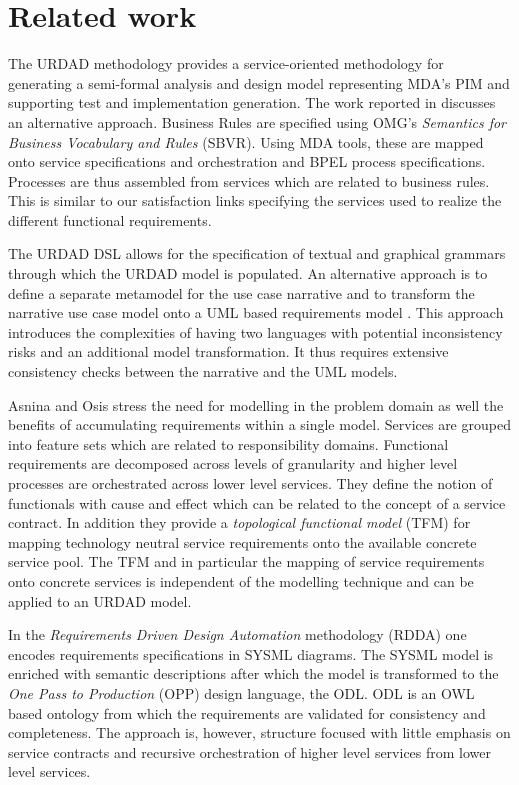 \section{Related work}
\label{sec:relatedWork}
The URDAD methodology provides a service-oriented methodology for generating a semi-formal analysis and design model representing MDA's PIM and supporting test and implementation generation. The work reported in \cite{iacob_model-driven_2008} discusses an alternative approach. Business Rules are specified using OMG's {\em Semantics for Business Vocabulary and Rules} (SBVR). Using MDA tools, these are mapped onto service specifications and orchestration and BPEL process specifications. Processes are thus assembled from services which are related to business rules. This is similar to our satisfaction links specifying the services used to realize the different functional requirements.

The URDAD DSL allows for the specification of textual and graphical grammars through which the URDAD model is populated. An alternative approach is to define a separate metamodel for the use case narrative and to transform the narrative use case model onto a UML based requirements model \cite{hoffmann_towards_2009,osis_transforming_2010}. This approach introduces the complexities of having two languages with potential inconsistency risks and an additional model transformation. It thus requires extensive consistency checks between the narrative and the UML models.

Asnina and Osis \cite{asnina_computation_2010} stress the need for modelling in the problem domain as well the benefits of accumulating requirements within a single model. Services are grouped into feature sets which are related to responsibility domains. Functional requirements are decomposed across levels of granularity and higher level processes are orchestrated across lower level services. They define the notion of functionals with cause and effect which can be related to the concept of a service contract. In addition they provide a {\em topological functional model} (TFM) for mapping technology neutral service requirements onto the available concrete service pool. The TFM and in particular the mapping of service requirements onto concrete services is independent of the modelling technique and can be applied to an URDAD model. 

In the {\em Requirements Driven Design Automation} methodology (RDDA) \cite{cardei_model_2008} one encodes requirements specifications in SYSML diagrams. The SYSML model is enriched with semantic descriptions after which the model is transformed to the {\em One Pass to Production} (OPP) design language, the ODL. ODL is an OWL based ontology from which the requirements are validated for consistency and completeness. The approach is, however, structure focused with little emphasis on service contracts and recursive orchestration of higher level services from lower level services.

